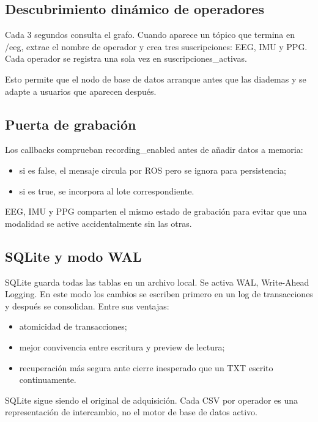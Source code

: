 \documentclass[11pt,a4paper]{article}
\begin{document}
\subsection{Descubrimiento dinámico de operadores}

Cada 3 segundos consulta el grafo. Cuando aparece un tópico que termina en {\ttfamily\small /eeg}, extrae el nombre de operador y crea tres suscripciones: EEG, IMU y PPG. Cada operador se registra una sola vez en {\ttfamily\small suscripciones\_activas}.

Esto permite que el nodo de base de datos arranque antes que las diademas y se adapte a usuarios que aparecen después.

\subsection{Puerta de grabación}

Los callbacks comprueban {\ttfamily\small recording\_enabled} antes de añadir datos a memoria:

\begin{itemize}
\item si es {\ttfamily\small false}, el mensaje circula por ROS pero se ignora para persistencia;
\item si es {\ttfamily\small true}, se incorpora al lote correspondiente.
\end{itemize}

EEG, IMU y PPG comparten el mismo estado de grabación para evitar que una modalidad se active accidentalmente sin las otras.

\subsection{SQLite y modo WAL}

SQLite guarda todas las tablas en un archivo local. Se activa WAL, Write-Ahead Logging. En este modo los cambios se escriben primero en un log de transacciones y después se consolidan. Entre sus ventajas:

\begin{itemize}
\item atomicidad de transacciones;
\item mejor convivencia entre escritura y preview de lectura;
\item recuperación más segura ante cierre inesperado que un TXT escrito continuamente.
\end{itemize}

SQLite sigue siendo el original de adquisición. Cada CSV por operador es una representación de intercambio, no el motor de base de datos activo.
\end{document}
